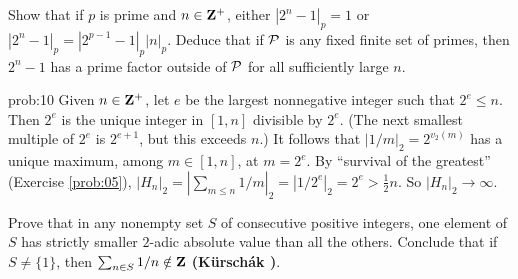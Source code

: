 \begin{challenge} Show that if $p$ is prime and $n\in \mathbf{Z}^{+}$, either $|2^n-1|_p=1$ or $|2^n-1|_p = |2^{p-1}-1|_p |n|_p$. Deduce that if $\mathcal{P}$ is any fixed finite set of primes, then $2^n-1$ has a prime factor outside of $\mathcal{P}$ for all sufficiently large $n$. 
\end{challenge}

\begin{sol}{prob:10} Given $n \in \mathbf{Z}^{+}$, let $e$ be the largest nonnegative integer such that $2^{e}\le n$. Then $2^e$ is the unique integer in $[1,n]$ divisible by $2^e$. (The next smallest multiple of $2^e$ is $2^{e+1}$, but this exceeds $n$.) It follows that $|1/m|_{2} = 2^{v_2(m)}$ has a unique maximum, among $m \in [1,n]$, at $m=2^e$. By ``survival of the greatest'' (Exercise \ref{prob:05}), $|H_n|_2 = |\sum_{m \le n} 1/m|_{2} = |1/2^e|_{2}= 2^{e} > \frac{1}{2}n$. So $|H_n|_2\to\infty$.

\begin{challenge} Prove that in any nonempty set $S$ of consecutive positive integers, one element of $S$ has strictly smaller $2$-adic absolute value than all the     others. Conclude that if $S\ne\{1\}$, then $\sum_{n \in S} 1/n \notin \mathbf{Z}$ \textbf{(Kürschák \cite{kurschak})}.
\end{challenge} 
\end{sol}


